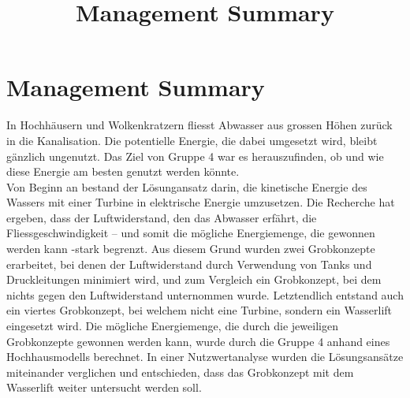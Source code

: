 \documentclass[12pt]{article}
\title{Management Summary}
\begin{document}
\section*{Management Summary}
In Hochhäusern und Wolkenkratzern fliesst Abwasser aus grossen Höhen zurück in die Kanalisation. Die potentielle Energie, die dabei umgesetzt wird, bleibt gänzlich ungenutzt. Das Ziel von Gruppe 4 war es herauszufinden, ob und wie diese Energie am besten genutzt werden könnte. \\


Von Beginn an bestand der Lösungansatz darin, die kinetische Energie des Wassers mit einer Turbine in elektrische Energie umzusetzen. Die Recherche hat ergeben, dass der Luftwiderstand, den das Abwasser erfährt, die Fliessgeschwindigkeit – und somit die mögliche Energiemenge, die gewonnen werden kann -stark begrenzt. Aus diesem Grund wurden zwei Grobkonzepte erarbeitet, bei denen der Luftwiderstand durch Verwendung von Tanks und Druckleitungen minimiert wird, und zum Vergleich ein Grobkonzept, bei dem nichts gegen den Luftwiderstand unternommen wurde. Letztendlich entstand auch ein viertes Grobkonzept, bei welchem nicht eine Turbine, sondern ein Wasserlift eingesetzt wird. Die mögliche Energiemenge, die durch die jeweiligen Grobkonzepte gewonnen werden kann, wurde durch die Gruppe 4 anhand eines Hochhausmodells berechnet. In einer Nutzwertanalyse wurden die Lösungsansätze miteinander verglichen und entschieden, dass das Grobkonzept mit dem Wasserlift weiter untersucht werden soll.\\
\end{document}
